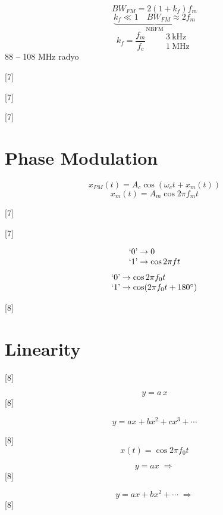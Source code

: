 \documentclass[11pt,a4paper]{article}
\begin{document}
\[ BW_{FM} = 2(1+k_f)f_m \]
\[ \underbrace{k_f \ll 1 \quad BW_{FM} \approx 2 f_m}_{\mathrm{NBFM}} \]
\[ k_f = \frac{f_m}{f_c} \qquad \begin{matrix} 3\ \mathrm{kHz}\\ 1\ \mathrm{MHz} \end{matrix} \]
88 -- 108 MHz radyo

[7]

[7]

[7]

\section{Phase Modulation}
\[ x_{PM}(t) = A_c\cos\left(\omega_c t + x_m(t)\right) \]
\[ x_m(t) = A_m\cos 2\pi f_m t \]

[7]

[7]

\[
\begin{array}{@{}l@{}}
\text{`0'} \rightarrow 0\\
\text{`1'} \rightarrow \cos 2\pi f t
\end{array}
\]
\[
\begin{array}{@{}l@{}}
\text{`0'} \rightarrow \cos 2\pi f_0 t\\
\text{`1'} \rightarrow \cos(2\pi f_0 t + 180^\circ)
\end{array}
\]

[8]

\okunamadi{}

\section{Linearity}
[8]

\[ y = a\,x \]
[8]

\[ y = ax + bx^2 + cx^3 + \cdots \]

[8]
\[ x(t) = \cos 2\pi f_0 t \]

\[ y = ax \;\Longrightarrow \]
[8]

\[ y = ax + bx^2 + \cdots \;\Longrightarrow \]
[8]

\end{document}
